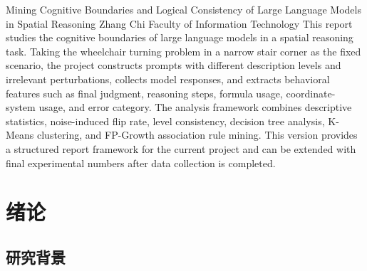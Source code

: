 \documentclass{BJUTReport}
\begin{document}
\coverpage

\begin{authorization}
\end{authorization}

\begin{abstract}
本文围绕“电动轮椅能否在狭窄楼梯转角处完成 90 度转弯”这一空间推理任务，构建多层级 Prompt 数据集，将大语言模型的回答视为可挖掘的行为数据，分析模型在自然语言描述、参数化描述和数学建模描述之间的判断稳定性与认知边界。实验设计包括 20 个空间场景、3 个描述层级和 5 类无关干扰条件，形成 300 条基础 Prompt；随后采集模型回复，并抽取最终判断、推理步骤、公式使用、坐标系使用和错误类型等行为特征。分析阶段采用准确率统计、噪声翻转率、层级一致性、决策树、K-Means 聚类和 FP-Growth 关联规则等方法，识别模型在空间建模任务中的典型失效模式。本文当前为报告框架版本，后续可在真实模型采集完成后补充具体数值、图表解释和结论。
\end{abstract}

\begin{abstractEN}
{Mining Cognitive Boundaries and Logical Consistency of Large Language Models in Spatial Reasoning}
{Zhang Chi}
{Faculty of Information Technology}
{This report studies the cognitive boundaries of large language models in a spatial reasoning task. Taking the wheelchair turning problem in a narrow stair corner as the fixed scenario, the project constructs prompts with different description levels and irrelevant perturbations, collects model responses, and extracts behavioral features such as final judgment, reasoning steps, formula usage, coordinate-system usage, and error category. The analysis framework combines descriptive statistics, noise-induced flip rate, level consistency, decision tree analysis, K-Means clustering, and FP-Growth association rule mining. This version provides a structured report framework for the current project and can be extended with final experimental numbers after data collection is completed.}
\end{abstractEN}

\contentpage

\section{绪论}

\subsection{研究背景}
\end{document}
